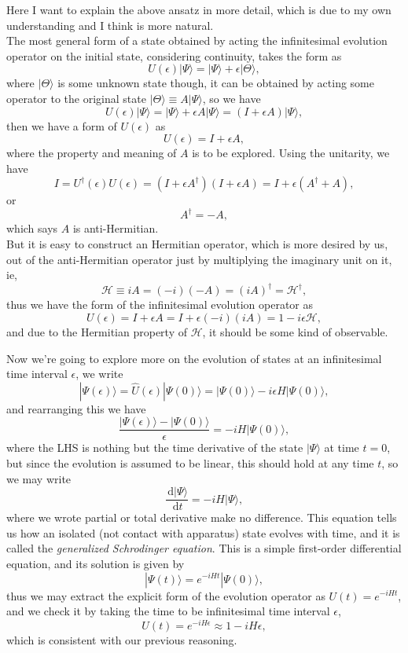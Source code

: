 \documentclass{article}
\newcommand{\be}{\begin{equation}}
\newcommand{\ee}{\end{equation}}
\newcommand{\dif}{\,\mathrm{d}}
\newcommand{\1}{\left}
\newcommand{\2}{\right}
\newcommand{\ma}{\mathcal}
\newcommand{\ra}{\rangle}
\newcommand{\ep}{\epsilon}
\begin{document}
{\color{blue}Here I want to explain the above ansatz in more detail, which is due to my own understanding and I think is more natural.\\
The most general form of a state obtained by acting the infinitesimal evolution operator on the initial state, considering continuity, takes the form as
\be
U(\ep)|\Psi\ra=|\Psi\ra+\ep|\Theta\ra,
\ee
where $|\Theta\ra$ is some unknown state though, it can be obtained by acting some operator to the original state $|\Theta\ra\equiv A|\Psi\ra$, so we have
\be
U(\ep)|\Psi\ra=|\Psi\ra+\ep A|\Psi\ra =(I+\ep A)|\Psi\ra,
\ee
then we have a form of $U(\ep)$ as
\be
U(\epsilon)=I+\ep A,
\ee
where the property and meaning of $A$ is to be explored. Using the unitarity, we have
\be
I=U^\dagger(\epsilon)U(\epsilon)=(I+\ep A^\dagger)(I+\ep A)=I+\epsilon (A^\dagger+A),
\ee
or
\be
A^\dagger=-A,
\ee
which says $A$ is anti-Hermitian.\\
But it is easy to construct an Hermitian operator, which is more desired by us, out of the anti-Hermitian operator just by multiplying the imaginary unit on it, ie, 
\be\ma H\equiv iA =(-i)(-A)= (iA)^\dagger = \ma H^\dagger,\ee
thus we have the form of the infinitesimal evolution operator as
\be
U(\epsilon)=I+\ep A=I+\epsilon (-i)(iA)=1-i\ep\ma H,
\ee
and due to the Hermitian property of $\ma H$, it should be some kind of observable.\\}

Now we're going to explore more on the evolution of states at an infinitesimal time interval $\epsilon$, we write
\be
|\Psi(\ep)\ra=\hat U(\ep) |\Psi(0)\ra = |\Psi(0)\ra-i\ep H|\Psi(0)\ra,
\ee
and rearranging this we have
\be
\frac{|\Psi(\ep)\ra-|\Psi(0)\ra}{\ep}=-iH|\Psi(0)\ra,
\ee
where the LHS is nothing but the time derivative of the state $|\Psi\ra$ at time $t=0$, but since the evolution is assumed to be linear, this should hold at any time $t$, so we may write
\be
\frac{\dif |\Psi\ra}{\dif t}=-i H|\Psi\ra,
\ee
where we wrote partial or total derivative make no difference. This equation tells us how an isolated (not contact with apparatus) state evolves with time, and it is called the \textit{generalized Schrodinger equation}. This is a simple first-order differential equation, and its solution is given by
\be
|\Psi(t)\ra=e^{-iHt}|\Psi(0)\ra,
\ee
thus we may extract the explicit form of the evolution operator as $U(t)=e^{-iHt}$, and we check it by taking the time to be infinitesimal time interval $\ep$,
\be
U(t)=e^{-iH\ep}\approx 1-iH\ep,
\ee
which is consistent with our previous reasoning.
\end{document}
